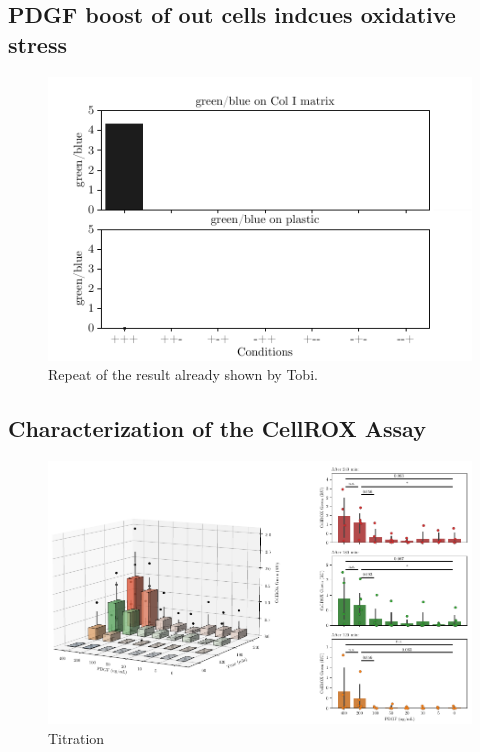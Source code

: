     \subsection{PDGF boost of out cells indcues oxidative stress}
    \begin{figure}[htbp]
    \capstart
        \centering
    	\includegraphics{Abbildung/CellROX_initial_cond.pdf}

    	\begin{minipage}{\captionwidth}
    		\caption[repeat_Lisa]{ \newline Repeat of the result already shown by Tobi.}
    		\label{fig:qPCR}
    	\end{minipage}
    \end{figure}

    \subsection{Characterization of the CellROX Assay}
    \begin{figure}[htbp]
    \capstart
        \centering
    	\includegraphics{Abbildung/CellROX_titration_no_norm.pdf}

    	\begin{minipage}{\captionwidth}
    		\caption[cellROX_titration]{ \newline Titration}
    		\label{fig:qPCR}
    	\end{minipage}
    \end{figure}

